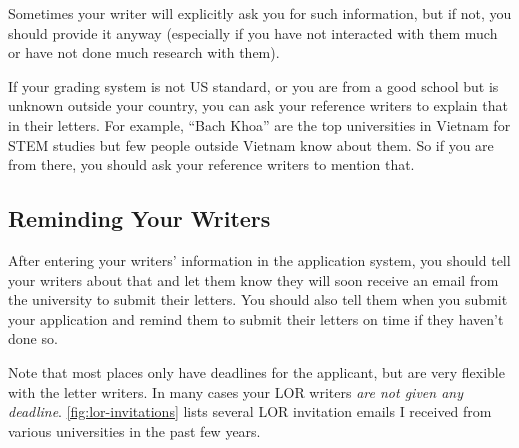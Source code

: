 \documentclass[oneside,11pt]{book}
\newenvironment{commentbox}[1][]{
  \small
  \begin{marker}[\faChessPawn{}]
    {\textbf{#1}}
  }{
  \end{marker}
}
\begin{document}
Sometimes your writer will explicitly ask you for such information, but if not, you should provide it anyway (especially if you have not interacted with them much or have not done much research with them).

\begin{commentbox}
    If your grading system is not US standard, or you are from a good school but is unknown outside your country, you can ask your reference writers to explain that in their letters.  For example, ``Bach Khoa'' are the top universities in Vietnam for STEM studies but few people outside Vietnam know about them.  So if you are from there, you should ask your reference writers to mention that.
\end{commentbox}
  
  
\subsection{Reminding Your Writers}\label{sec:remind-writers}

After entering your writers' information in the application system, you should tell your writers about that and let them know they will soon receive an email from the university to submit their letters.  You should also tell them when you submit your application and remind them to submit their letters on time if they haven't done so. 

Note that most places only have deadlines for the applicant, but are very flexible with the letter writers.  In many cases your LOR writers \emph{are not given any deadline}. \autoref{fig:lor-invitations} lists several LOR invitation emails I received from various universities in the past few years. 
\end{document}
